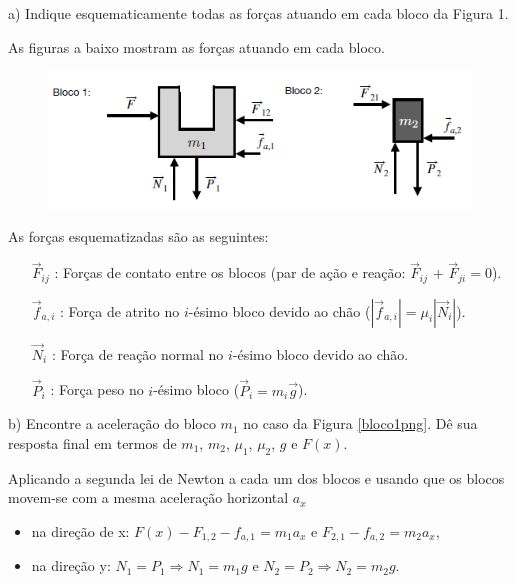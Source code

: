 \begin{enumerate}[start=1,label={\bfseries Q\arabic*.}]
a) Indique esquematicamente todas as forças atuando em cada bloco da Figura 1.

\resposta

As figuras a baixo mostram as forças atuando em cada bloco.

\begin{figure}[H]
\centering
\includegraphics[scale=0.7]{classica-img/bloco1.png}
\end{figure}

As forças esquematizadas são as seguintes:

\begin{itemize}
\item[$\vec{F}_{ij}$]: Forças de contato entre os blocos (par de ação e reação: $\vec{F}_{ij}$ + $\vec{F}_{ji} = 0$).
\item[$\vec{f}_{a,i}$]: Força de atrito no $i$-ésimo bloco devido ao chão ($|\vec{f}_{a,i}| = \mu_{i} |\vec{N}_{i}|$).
\item[$\vec{N}_{i}$]: Força de reação normal no $i$-ésimo bloco devido ao chão.
\item[$\vec{P}_{i}$]: Força peso no $i$-ésimo bloco ($\vec{P}_{i} = m_{i}\vec{g}$).
\end{itemize}



b) Encontre a aceleração do bloco $m_{1}$ no caso da Figura \ref{bloco1png}. Dê sua resposta final em termos de $m_{1}$, $m_{2}$, $\mu_{1}$, $\mu_{2}$, $g$ e $F(x)$.

\resposta

Aplicando a segunda lei de Newton a cada um dos blocos e usando que os blocos movem-se com a mesma aceleração horizontal $a_{x}$

\begin{itemize}
\item na direção de x: $F(x) - F_{1,2} - f_{a,1} = m_{1}a_{x}$ \quad e \quad $F_{2,1} - f_{a,2} = m_{2}a_{x}$,

\item na direção y: $N_{1} = P_{1} \Rightarrow N_{1} = m_{1}g $ \quad e \quad $N_{2} = P_{2} \Rightarrow N_{2} = m_{2}g $.


\end{itemize}
\end{enumerate}
